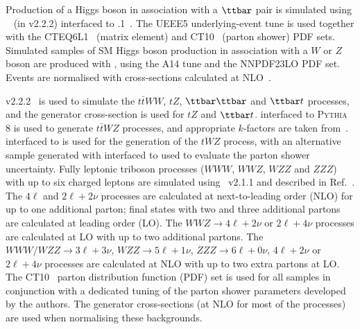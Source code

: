 Production of a Higgs boson in association with a $\ttbar$ pair is simulated using \AMCATNLO~\cite{Alwall:2014hca} 
(in \MADGRAPH v2.2.2) interfaced to .1~\cite{Corcella:2000bw}.  
The UEEE5 underlying-event tune is used together with the CTEQ6L1~\cite{Pumplin:2002vw} (matrix element) and CT10~\cite{Lai:2010vv} (parton shower) PDF sets.
Simulated samples of SM Higgs boson production in association with a $W$ or $Z$ boson are produced with , using the \textsc{A14} tune and the \textsc{NNPDF23LO} PDF set. Events are normalised with cross-sections calculated at NLO~\cite{Dittmaier:2012vm}.

\MADGRAPH v2.2.2~\cite{Alwall:2011uj} is used to simulate the $t\bar{t}WW$, $tZ$, $\ttbar\ttbar$ and $\ttbar t$ processes, and the generator cross-section is used for $tZ$ and $\ttbar t$. \MADGRAPH interfaced to \textsc{Pythia} 8 is used to generate $t\bar{t}WZ$ processes, and appropriate $k$-factors are taken from~\cite{Alwall:2014hca}. \AMCATNLO interfaced to  is used for the generation of the $tWZ$ process, with an alternative sample generated with \AMCATNLO interfaced to \HERWIG used to evaluate the parton shower uncertainty.  
Fully leptonic triboson processes ($WWW$, $WWZ$, $WZZ$ and $ZZZ$) with up to six charged leptons are simulated using \SHERPA~v2.1.1 
and described in Ref.~\cite{ATL-PHYS-PUB-2016-002}. 
The $4\ell$ and $2\ell+2\nu$ processes are calculated at next-to-leading order (NLO) for up to one additional parton; 
final states with two and three additional partons are calculated at leading order (LO). 
The $WWZ\to 4\ell+2\nu$ or $2\ell+4\nu$ processes are calculated at LO with up to two additional partons. 
The $WWW/WZZ\to 3\ell+3\nu$, $WZZ\to 5\ell+1\nu$, $ZZZ\to 6\ell+0\nu$, $4\ell+2\nu$ or $2\ell+4\nu$ processes 
are calculated at NLO with up to two extra partons at LO. 
The CT10~\cite{Lai:2010vv} parton distribution function (PDF) set is used for all \SHERPA samples in conjunction with 
a dedicated tuning of the parton shower parameters developed by the \SHERPA authors. 
The generator cross-sections (at NLO for most of the processes) are used when normalising these backgrounds.

